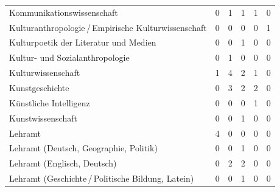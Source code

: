 \documentclass{scrartcl}
\begin{document}
\begin{landscape}
\begin{longtable}{L{7.5cm}ccccc}
      Kommunikationswissenschaft                              & 0                     &  1                       &  1                       & 1                    & 0                       \\
      Kulturanthropologie\,/\,Empirische Kulturwissenschaft   & 0                     &  0                       &  0                       & 0                    & 1                       \\
      Kulturpoetik der Literatur und Medien                   & 0                     &  0                       &  1                       & 0                    & 0                       \\
      Kultur- und Sozialanthropologie                         & 0                     &  1                       &  0                       & 0                    & 0                       \\
      Kulturwissenschaft                                      & 1                     &  4                       &  2                       & 1                    & 0                       \\
      Kunstgeschichte                                         & 0                     &  3                       &  2                       & 2                    & 0                       \\
      Künstliche Intelligenz                                  & 0                     &  0                       &  0                       & 1                    & 0                       \\
      Kunstwissenschaft                                       & 0                     &  0                       &  1                       & 0                    & 0                       \\
      Lehramt                                                 & 4                     &  0                       &  0                       & 0                    & 0                       \\
      Lehramt (Deutsch, Geographie, Politik)                  & 0                     &  0                       &  1                       & 0                    & 0                       \\
      Lehramt (Englisch, Deutsch)                             & 0                     &  2                       &  2                       & 0                    & 0                       \\
      Lehramt (Geschichte\,/\,Politische Bildung, Latein)     & 0                     &  0                       &  1                       & 0                    & 0                       \\

\end{longtable}
\end{landscape}
\end{document}
